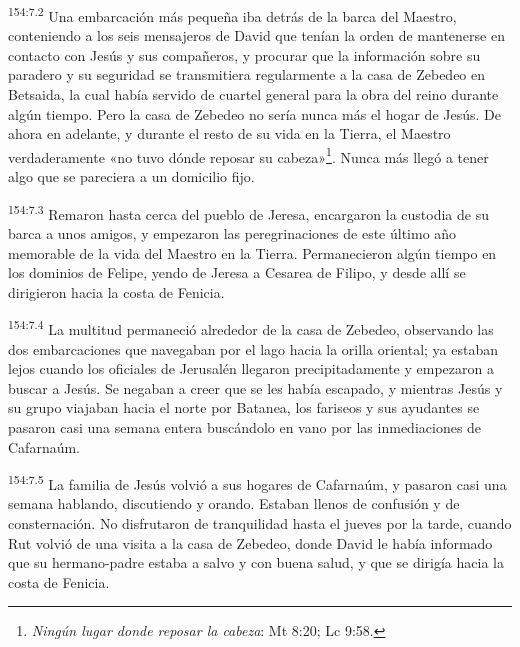 \par 
\textsuperscript{154:7.2} Una embarcación más pequeña iba detrás de la barca del Maestro, conteniendo a los seis mensajeros de David que tenían la orden de mantenerse en contacto con Jesús y sus compañeros, y procurar que la información sobre su paradero y su seguridad se transmitiera regularmente a la casa de Zebedeo en Betsaida, la cual había servido de cuartel general para la obra del reino durante algún tiempo. Pero la casa de Zebedeo no sería nunca más el hogar de Jesús. De ahora en adelante, y durante el resto de su vida en la Tierra, el Maestro verdaderamente «no tuvo dónde reposar su cabeza»\footnote{\textit{Ningún lugar donde reposar la cabeza}: Mt 8:20; Lc 9:58.}. Nunca más llegó a tener algo que se pareciera a un domicilio fijo.

\par 
\textsuperscript{154:7.3} Remaron hasta cerca del pueblo de Jeresa, encargaron la custodia de su barca a unos amigos, y empezaron las peregrinaciones de este último año memorable de la vida del Maestro en la Tierra. Permanecieron algún tiempo en los dominios de Felipe, yendo de Jeresa a Cesarea de Filipo, y desde allí se dirigieron hacia la costa de Fenicia.

\par 
\textsuperscript{154:7.4} La multitud permaneció alrededor de la casa de Zebedeo, observando las dos embarcaciones que navegaban por el lago hacia la orilla oriental; ya estaban lejos cuando los oficiales de Jerusalén llegaron precipitadamente y empezaron a buscar a Jesús. Se negaban a creer que se les había escapado, y mientras Jesús y su grupo viajaban hacia el norte por Batanea, los fariseos y sus ayudantes se pasaron casi una semana entera buscándolo en vano por las inmediaciones de Cafarnaúm.

\par 
\textsuperscript{154:7.5} La familia de Jesús volvió a sus hogares de Cafarnaúm, y pasaron casi una semana hablando, discutiendo y orando. Estaban llenos de confusión y de consternación. No disfrutaron de tranquilidad hasta el jueves por la tarde, cuando Rut volvió de una visita a la casa de Zebedeo, donde David le había informado que su hermano-padre estaba a salvo y con buena salud, y que se dirigía hacia la costa de Fenicia.